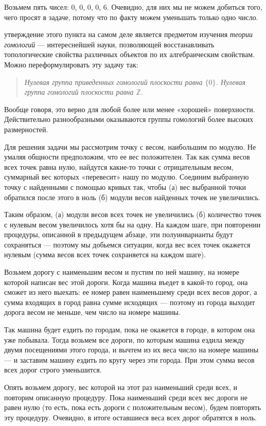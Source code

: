 ﻿
\begin{itemize}
\itA Возьмем пять чисел: 0, 0, 0, 0, 6. Очевидно, для них мы не можем добиться того, чего просят в задаче, потому что по факту можем уменьшать только одно число.

 утверждение этого пункта на самом деле является предметом изучения {\itshape теории гомологий} — интереснейшей науки, позволяющей восстанавливать топологические свойства различных объектов по их алгебраическим свойствам. Можно переформулировать эту задачу так:

\begin{quote} \itshape
	Нулевая группа приведенных гомологий плоскости равна $\{0\}$. Нулевая группа гомологий плоскости равна $\mathbb Z$.
\end{quote}

Вообще говоря, это верно для любой более или менее «хорошей» поверхности. Действительно разнообразными оказываются группы гомологий более высоких размерностей.

Для решения задачи мы рассмотрим точку с весом, наибольшим по модулю. Не умаляя общности предположим, что ее вес положителен. Так как сумма весов всех точек равна нулю, найдутся какие-то точки с отрицательным весом, суммарный вес которых «перевесит» нашу по модулю. Соединим выбранную точку с найденными с помощью кривых так, чтобы (а) вес выбранной точки обратился после этого в ноль (б) модули весов найденных точек не увеличились.

Таким образом, (а) модули весов всех точек не увеличились (б) количество точек с нулевым весом увеличилось хотя бы на одну. На каждом шаге, при повторении процедуры, описанной в предыдущем абзаце, эти полуинварианты будут сохраняться — поэтому мы добьемся ситуации, когда вес всех точек окажется нулевым (сумма весов всех точек сохраняется на каждом шаге).

\itC Возьмем дорогу с наименьшим весом и пустим по ней машину, на номере которой написан вес этой дороги. Когда машина въедет в какой-то город, она сможет из него выехать: ее номер равен наименьшему среди всех весов дорог, а сумма входящих в город равна сумме исходящих — поэтому из города выходит дорога весом не меньше, чем число на номере машины.

Так машина будет ездить по городам, пока не окажется в городе, в котором она уже побывала. Тогда возьмем все дороги, по которым машина ездила между двумя посещениями этого города, и вычтем из их веса число на номере машины — и заставим машину ездить по кругу через эти города. При этом сумма весов всех дорог строго уменьшится.

Опять возьмем дорогу, вес которой на этот раз наименьший среди всех, и повторим описанную процедуру. Пока наименьший среди всех вес дороги не равен нулю (то есть, пока есть дороги с положительным весом), будем повторять эту процедуру. Очевидно, в итоге оставшиеся веса всех дорог обратятся в ноль.
\end{itemize}